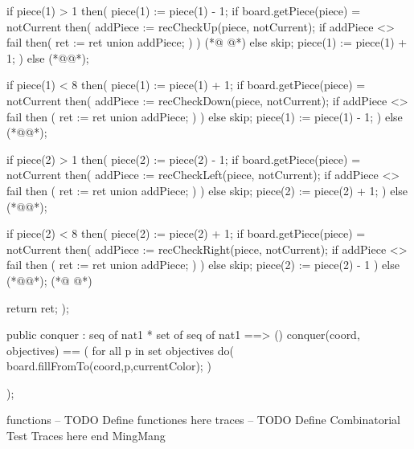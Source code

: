 \begin{vdmpp}[breaklines=true]
  if piece(1) > 1
  then(
   piece(1) := piece(1) - 1;
   if board.getPiece(piece) = notCurrent
   then( 
    addPiece := recCheckUp(piece, notCurrent);
    if addPiece <> fail
    then(
     ret := ret union {addPiece};
     )
   )
(*@
\label{recCheckRight:179}
@*)
   else skip;
   piece(1) := piece(1) + 1;
  )
  else
   (*@@*);
   
  if piece(1) < 8
  then(
   piece(1) := piece(1) + 1;
   if board.getPiece(piece) = notCurrent
   then(
    addPiece := recCheckDown(piece, notCurrent);
    if addPiece <> fail
    then (
     ret := ret union {addPiece};
     )
   )
   else skip;
   piece(1) := piece(1) - 1;
  )
  else (*@@*);
  
  if piece(2) > 1
  then(
   piece(2) := piece(2) - 1;
   if board.getPiece(piece) = notCurrent
   then(
    addPiece := recCheckLeft(piece, notCurrent);
    if addPiece <> fail
    then (
     ret := ret union {addPiece};
     )
   )
   else skip;
   piece(2) := piece(2) + 1;
  ) 
  else (*@@*); 
  
  if piece(2) < 8
  then(
   piece(2) := piece(2) + 1;
   if board.getPiece(piece) = notCurrent
   then(
    addPiece := recCheckRight(piece, notCurrent);
    if addPiece <> fail
    then (
     ret := ret union {addPiece};
     )
   )
   else skip;
   piece(2) := piece(2) - 1
  )
  else (*@@*);
(*@
\label{conquer:232}
@*)
 
 return ret;
 );
 
 
 public conquer : seq of nat1 * set of seq of nat1 ==> ()
 conquer(coord, objectives) ==
 (
  for all p in set objectives do(
   board.fillFromTo(coord,p,currentColor);
   )
  
 );

functions
-- TODO Define functiones here
traces
-- TODO Define Combinatorial Test Traces here
end MingMang
\end{vdmpp}
\bigskip
